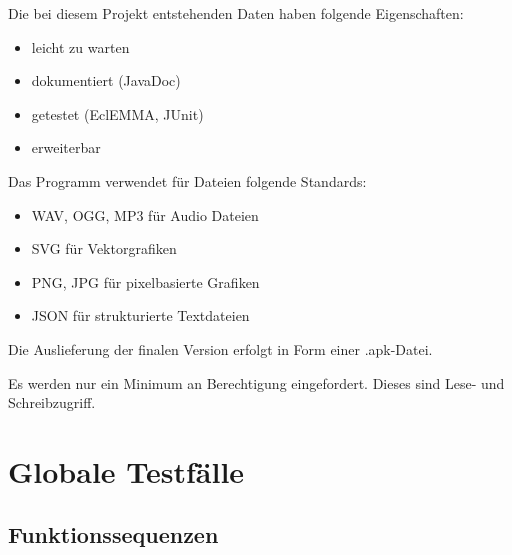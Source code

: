 \documentclass{scrartcl}
\begin{document}
\begin{nflist}[resume]
	\item Die bei diesem Projekt entstehenden Daten haben folgende Eigenschaften:
	\begin{itemize}
		\item leicht zu warten
		\item dokumentiert (JavaDoc)
		\item getestet (EclEMMA, JUnit)
		\item erweiterbar
	\end{itemize}
	\item Das Programm verwendet für Dateien folgende Standards: 
	\begin{itemize}
		\item WAV, OGG, MP3 für Audio Dateien 
		\item SVG für Vektorgrafiken
		\item PNG, JPG für pixelbasierte Grafiken
		\item JSON für strukturierte Textdateien
	\end{itemize}
	\item Die Auslieferung der finalen Version erfolgt in Form einer .apk-Datei.
	\item Es werden nur ein Minimum an Berechtigung eingefordert. Dieses sind Lese- und Schreibzugriff.
\end{nflist}

\clearpage








\section{Globale Testfälle}

\subsection{Funktionssequenzen}
\end{document}
